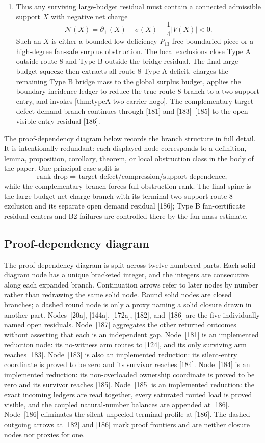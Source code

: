 \documentclass[11pt]{article}
\newcommand{\defp}{\partial_+}
\newcommand{\No}{\mathcal N}
\begin{document}
\begin{enumerate}[label=(\arabic*)]
\[\]
\item Thus any surviving large-budget residual must contain a connected admissible support $X$ with negative net charge
\[
\No(X)=\defp(X)-\sigma(X)-\frac14|V(X)|<0.
\]
Such an $X$ is either a bounded low-deficiency $P_{13}$-free boundaried piece or a
high-degree fan-safe surplus obstruction.  The local exclusions close Type A
outside route 8 and Type B outside the bridge residual.  The final large-budget
squeeze then extracts all route-8 Type A deficit, charges the remaining Type B
bridge mass to the global surplus budget, applies the boundary-incidence ledger to reduce
the true route-8 branch to a two-support entry, and invokes
\cref{thm:typeA-two-carrier-nogo}.  The complementary target-defect demand
branch continues through [181] and [183]--[185] to the open visible-entry
residual [186].
\end{enumerate}


The proof-dependency diagram below records the branch structure in full detail.  It is intentionally redundant: each displayed node corresponds to a definition, lemma, proposition, corollary, theorem, or local obstruction class in the body of the paper.  One principal case split is
\[
\text{rank drop}\Rightarrow\text{target defect/compression/support dependence},
\]
while the complementary branch forces full obstruction rank.  The final spine is
the large-budget net-charge branch with its terminal two-support route-8
exclusion and its separate open demand residual [186]; Type B fan-certificate
residual centers and B2 failures are controlled there by the fan-mass estimate.



\subsection*{Proof-dependency diagram}

The proof-dependency diagram is split across twelve numbered parts.  Each
solid diagram node has a unique bracketed integer, and the integers are consecutive
along each expanded branch.  Continuation arrows refer to later nodes by number rather
than redrawing the same solid node.  Round solid nodes are closed branches; a
dashed round node is only a proxy naming a solid closure drawn in another part.
Nodes~[20a], [144a], [172a], [182], and~[186] are the five individually
named open residuals.  Node~[187] aggregates the other returned outcomes
without asserting that each is an independent gap.  Node~[181] is an
implemented reduction node: its no-witness arm routes to [124], and its only
surviving arm reaches [183].  Node~[183] is also an implemented reduction: its
silent-entry coordinate is proved to be zero and its survivor reaches [184].
Node~[184] is an implemented reduction: its non-overloaded ownership
coordinate is proved to be zero and its survivor reaches [185].
Node~[185] is an implemented reduction: the exact incoming ledgers are read
together, every saturated routed load is proved visible, and the coupled
natural-number balances are appended at [186].  Node~[186] eliminates the
silent-unpeeled terminal profile at [186].
The dashed outgoing arrows at [182] and [186]
mark proof frontiers and are neither closure nodes nor proxies for one.
\end{document}
